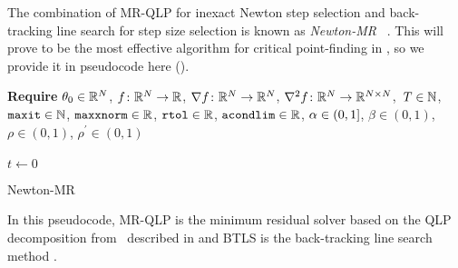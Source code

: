 \documentclass[../../thesis.tex]{subfiles}
\begin{document}
The combination of MR-QLP
for inexact Newton step selection
and back-tracking line search
for step size selection
is known as \emph{Newton-MR}%
~\cite{roosta2018}.
This will prove to be the most effective
algorithm for critical point-finding in
,
so we provide it in pseudocode here
().
\\
\begin{algorithm}[h]
    \SetAlgoLined{}
    \textbf{Require}
    $\theta_0 \in \mathbb{R}^N$,
    $f\colon\mathbb{R}^N\to\mathbb{R}$,
    $\nabla{f}\colon\mathbb{R}^N\to\mathbb{R}^N$,
    $\nabla^2{f}\colon\mathbb{R}^N\to\mathbb{R}^{N\times N}$,\
    $T\in \mathbb{N}$,\\
    $\texttt{maxit} \in \mathbb{N}$,
    $\texttt{maxxnorm} \in \mathbb{R}$,
    $\texttt{rtol} \in \mathbb{R}$,
    $\texttt{acondlim} \in \mathbb{R}$,
    $\alpha \in \intervaloc{0}{1}$,
    $\beta \in (0, 1)$,
    $\rho \in (0, 1)$,
    $\rho^\prime \in (0, 1)$\\ \ \\
    $t \leftarrow 0$\\
    \caption{Newton-MR}

\end{algorithm}
\noindent In this pseudocode,
MR-QLP is the minimum residual solver
based on the QLP decomposition
from~\cite{choi2011}
described in  and
BTLS is the back-tracking line search method
.
\end{document}
